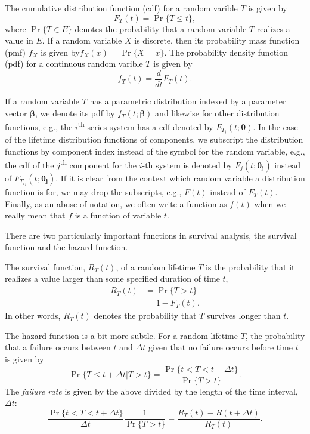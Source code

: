 \documentclass[
]{article}
\begin{document}
The cumulative distribution function (cdf) for a random varible \(T\) is
given by \begin{equation}
 F_T(t) = \Pr\{T \leq t\},
\end{equation} where \(\Pr\{T \in E\}\) denotes the probability that a
random variable \(T\) realizes a value in \(E\). If a random variable
\(X\) is discrete, then its probability mass function (pmf) \(f_X\) is
given by\(f_X(x) = \Pr\{X = x\}\). The probability density function
(pdf) for a continuous random varible \(T\) is given by \begin{equation}
f_T(t) = \frac{d}{dt} F_T(t).
\end{equation}

If a random variable \(T\) has a parametric distribution indexed by a
parameter vector \(\boldsymbol{\beta}\), we denote its pdf by
\(f_T(t;\boldsymbol{\beta})\) and likewise for other distribution
functions, e.g., the \(i\)\textsuperscript{th} series system has a cdf
denoted by \(F_{T_i}(t;\boldsymbol{\theta})\). In the case of the
lifetime distribution functions of components, we subscript the
distribution functions by component index instead of the symbol for the
random variable, e.g., the cdf of the \(j\)\textsuperscript{th}
component for the \(i\)-th system is denoted by
\(F_j(t;\boldsymbol{\theta_j})\) instead of
\(F_{T_{i j}}(t;\boldsymbol{\theta_j})\). If it is clear from the
context which random variable a distribution function is for, we may
drop the subscripts, e.g., \(F(t)\) instead of \(F_T(t)\). Finally, as
an abuse of notation, we often write a function as \(f(t)\) when we
really mean that \(f\) is a function of variable \(t\).

There are two particularly important functions in survival analysis, the
survival function and the hazard function.

\begin{definition}
The survival function, $R_T(t)$, of a random lifetime $T$ is the
probability that it realizes a value larger than some specified duration of time $t$,
\begin{equation}
\begin{split}
R_T(t) &= \Pr\{T > t\}\\
     &= 1 - F_T(t).
\end{split}
\end{equation}
In other words, $R_T(t)$ denotes the probability that $T$ survives longer than
$t$.
\end{definition}

The hazard function is a bit more subtle. For a random lifetime \(T\),
the probability that a failure occurs between \(t\) and \(\Delta t\)
given that no failure occurs before time \(t\) is given by \[
\Pr\{T \leq t+\Delta t|T > t\} = \frac{\Pr\{t < T < t+\Delta t\}}{\Pr\{T > t\}}.
\] The \emph{failure rate} is given by the above divided by the length
of the time interval, \(\Delta t\): \[
\frac{\Pr\{t < T < t+\Delta t\}}{\Delta t} \frac{1}{\Pr\{T > t\}} =
    \frac{R_T(t) - R(t+\Delta t)}{R_T(t)}.
\]
\end{document}
